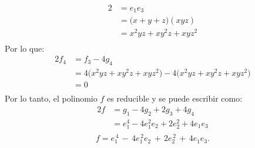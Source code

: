 \begin{solucion}
\begin{alignat*}{2}
            &=e_1e_3\\
            &=\bigl(x+y+z\bigr)(xyz)\\
            &=x^{2}yz + xy^{2}z + xyz^{2}\\
    \end{alignat*}
    Por lo que:
    \begin{alignat*}{2}
        f_{4}&=f_{3}-4g_{4}\\
        &=4\bigl(x^{2}yz + xy^{2}z + xyz^{2}\bigr)-4\bigl(x^{2}yz + xy^{2}z + xyz^{2}\bigr)\\
        &=0\\
    \end{alignat*}
    Por lo tanto, el polinomio $f$ es reducible y se puede escribir como:
    \begin{alignat*}{2}
        f &=g_1 -4g_2 + 2g_3 + 4g_4\\
        &=e_1^{4} - 4e_1^2e_2 + 2e_2^2 + 4e_1e_3\\
    \end{alignat*}
    $$
    f
      = e_{1}^{\,4}\,-\,4e_{1}^{\,2}e_{2}\,+\,2e_{2}^{\,2}\,+\,4e_{1}e_{3}.$$
\end{solucion}
